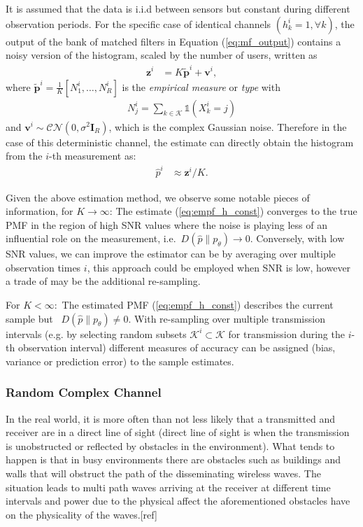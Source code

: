 \documentclass{article}
\begin{document}
It is assumed that the data is i.i.d between sensors but constant during different observation periods. For the specific case of identical channels ${(h^i_k = 1, \forall k)}$, the output of the bank of matched filters in Equation (\ref{eq:mf_output}) contains a noisy version of the histogram, scaled by the number of users, written as
%
\begin{align}
    \boldsymbol{z}^i &= K \tilde{\boldsymbol{p}}^i + \boldsymbol{v}^i, 
\end{align}
%
where $\tilde{\boldsymbol{p}}^i = \frac{1}{K}[N_1^i, \ldots, N_R^i]$ is the \emph{empirical measure} or \emph{type} with
\begin{align}
    N_j^i = \sum_{k \in \mathcal{K}}\mathbb{1}(X^i_k = j)
\end{align}
and $\boldsymbol{v}^i \sim \mathcal{CN}(0, {\sigma^2 \boldsymbol{I}_R})$, which is the complex Gaussian noise.
%
Therefore in the case of this deterministic channel, the estimate can directly obtain the histogram from the $i$-th measurement as:
%
\begin{align}
    \hat{p}^i &\approx \boldsymbol{z}^i / K. \label{eq:empf_h_const}
\end{align}

Given the above estimation method, we observe some notable pieces of information, for $K \rightarrow \infty$: The estimate (\ref{eq:empf_h_const}) converges to the true PMF in the region of high SNR values where the noise is playing less of an influential role on the measurement, i.e.~$D(\hat{p}\| p_{\theta}) \rightarrow 0$. Conversely, with low SNR values, we can improve the estimator can be by averaging over multiple observation times $i$, this approach could be employed when SNR is low, however a trade of may be the additional re-sampling. 

For $K <\infty:$ The estimated PMF (\ref{eq:empf_h_const}) describes the current sample but ~$D(\hat{p}\| p_{\theta}) \neq 0$. With re-sampling over multiple transmission intervals (e.g. by selecting random subsets $\mathcal{K}^i \subset \mathcal{K}$ for transmission during the $i$-th observation interval) different measures of accuracy can be assigned (bias, variance or prediction error) to the sample estimates.


\subsubsection{Random Complex Channel}\label{rand_chan}

In the real world, it is more often than not less likely that a transmitted and receiver are in a direct line of sight (direct line of sight is when the transmission is unobstructed or reflected by obstacles in the environment). What tends to happen is that in busy environments there are obstacles such as buildings and walls that will obstruct the path of the disseminating wireless waves. The situation leads to multi path waves arriving at the receiver at different time intervals and power due to the physical affect the aforementioned obstacles have on the physicality of the waves.[ref]
\end{document}
